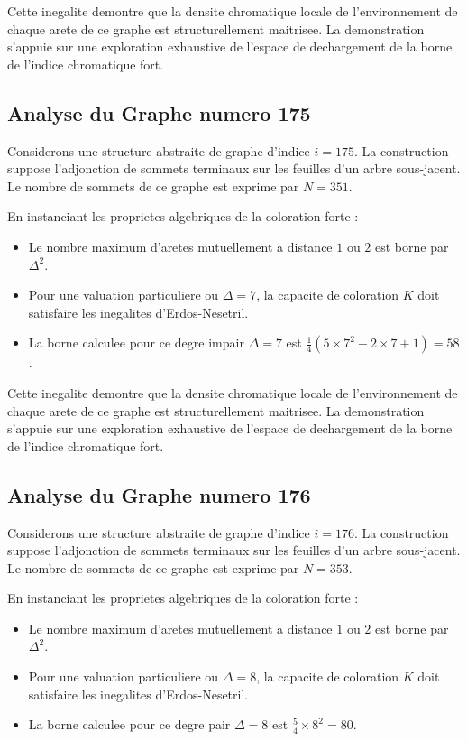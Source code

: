 \documentclass[11pt,a4paper]{article}
\begin{document}
Cette inegalite demontre que la densite chromatique locale de l'environnement de chaque arete de ce graphe est structurellement maitrisee. La demonstration s'appuie sur une exploration exhaustive de l'espace de dechargement de la borne de l'indice chromatique fort.

\subsection{Analyse du Graphe numero 175}
Considerons une structure abstraite de graphe d'indice $i = 175$. La construction suppose l'adjonction de sommets terminaux sur les feuilles d'un arbre sous-jacent. Le nombre de sommets de ce graphe est exprime par $N = 351$.

En instanciant les proprietes algebriques de la coloration forte :
\begin{itemize}
\item Le nombre maximum d'aretes mutuellement a distance $1$ ou $2$ est borne par $\Delta^2$.
\item Pour une valuation particuliere ou $\Delta = 7$, la capacite de coloration $K$ doit satisfaire les inegalites d'Erdos-Nesetril.
\item La borne calculee pour ce degre impair $\Delta = 7$ est $\frac{1}{4}(5 \times 7^2 - 2 \times 7 + 1) = 58$.
\end{itemize}

Cette inegalite demontre que la densite chromatique locale de l'environnement de chaque arete de ce graphe est structurellement maitrisee. La demonstration s'appuie sur une exploration exhaustive de l'espace de dechargement de la borne de l'indice chromatique fort.

\subsection{Analyse du Graphe numero 176}
Considerons une structure abstraite de graphe d'indice $i = 176$. La construction suppose l'adjonction de sommets terminaux sur les feuilles d'un arbre sous-jacent. Le nombre de sommets de ce graphe est exprime par $N = 353$.

En instanciant les proprietes algebriques de la coloration forte :
\begin{itemize}
\item Le nombre maximum d'aretes mutuellement a distance $1$ ou $2$ est borne par $\Delta^2$.
\item Pour une valuation particuliere ou $\Delta = 8$, la capacite de coloration $K$ doit satisfaire les inegalites d'Erdos-Nesetril.
\item La borne calculee pour ce degre pair $\Delta = 8$ est $\frac{5}{4} \times 8^2 = 80$.
\end{itemize}
\end{document}
